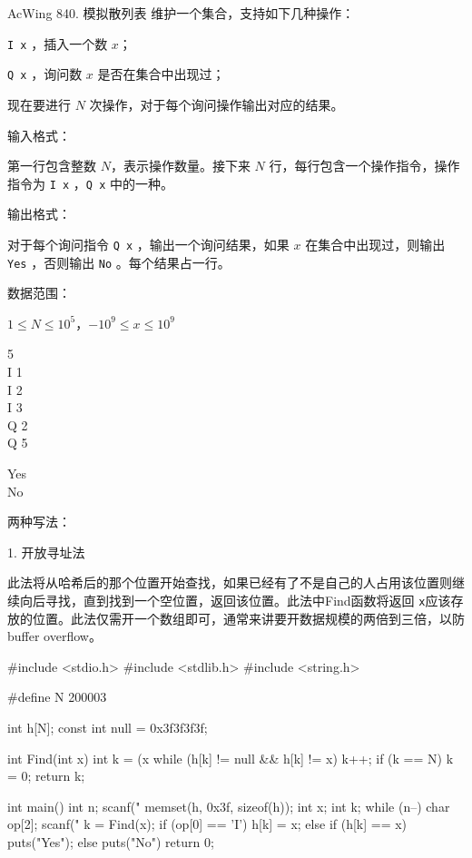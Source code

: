 \begin{titledbox}{AcWing 840. 模拟散列表}
维护一个集合，支持如下几种操作：

\lstinline{I x} ，插入一个数 $x$；

\lstinline{Q x} ，询问数 $x$ 是否在集合中出现过；

现在要进行 $N$ 次操作，对于每个询问操作输出对应的结果。

输入格式：

第一行包含整数 $N$，表示操作数量。接下来 $N$ 行，每行包含一个操作指令，操作指令为 \lstinline{I x} ，\lstinline{Q x}  中的一种。

输出格式：

对于每个询问指令 \lstinline{Q x} ，输出一个询问结果，如果 $x$ 在集合中出现过，则输出 \lstinline{Yes} ，否则输出 \lstinline{No} 。每个结果占一行。

数据范围：

$1 \le N \le 10^5$，$-10^9 \le x \le 10^9$

\begin{inputblock}
    5 \\
    I 1 \\
    I 2 \\
    I 3 \\
    Q 2 \\
    Q 5
\end{inputblock}
\begin{outputblock}
    Yes \\
    No
\end{outputblock}
\end{titledbox}

两种写法：

1. 开放寻址法

此法将从哈希后的那个位置开始查找，如果已经有了不是自己的人占用该位置则继续向后寻找，直到找到一个空位置，返回该位置。此法中Find函数将返回 \lstinline{x}应该存放的位置。此法仅需开一个数组即可，通常来讲要开数据规模的两倍到三倍，以防buffer overflow。

\begin{mycpptwocol}[开放寻址法]
#include <stdio.h>
#include <stdlib.h>
#include <string.h>

#define N 200003

int h[N];
const int null = 0x3f3f3f3f;

int Find(int x)
{
    int k = (x %
    while (h[k] != null && h[k] != x) {
        k++;
        if (k == N) {
            k = 0;
        }
    }
    return k;
}

int main()
{
    int n;
    scanf("%
    memset(h, 0x3f, sizeof(h));
    int x;
    int k;
    while (n--) {
        char op[2];
        scanf("%
        k = Find(x);
        if (op[0] == 'I') {
            h[k] = x;
        } else {
            if (h[k] == x) {
                puts("Yes");
            } else {
                puts("No")
            }
        }
    }
    return 0;
}
\end{mycpptwocol}

